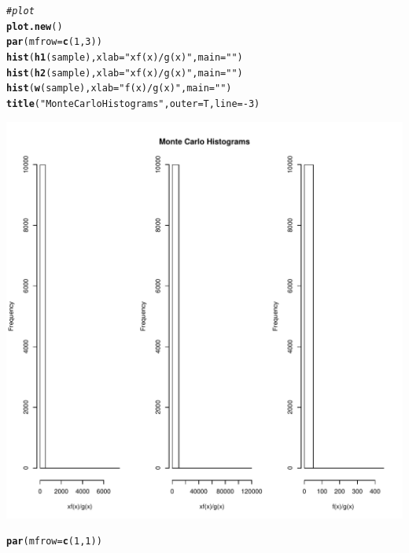 \documentclass[11pt]{article}\usepackage[]{graphicx}\usepackage[]{color}
\makeatletter
\def\maxwidth{ %
  \ifdim\Gin@nat@width>\linewidth
    \linewidth
  \else
    \Gin@nat@width
  \fi
}
\newcommand{\hlnum}[1]{\textcolor[rgb]{0.686,0.059,0.569}{#1}}%
\newcommand{\hlstr}[1]{\textcolor[rgb]{0.192,0.494,0.8}{#1}}%
\newcommand{\hlcom}[1]{\textcolor[rgb]{0.678,0.584,0.686}{\textit{#1}}}%
\newcommand{\hlopt}[1]{\textcolor[rgb]{0,0,0}{#1}}%
\newcommand{\hlstd}[1]{\textcolor[rgb]{0.345,0.345,0.345}{#1}}%
\newcommand{\hlkwc}[1]{\textcolor[rgb]{0.333,0.667,0.333}{#1}}%
\newcommand{\hlkwd}[1]{\textcolor[rgb]{0.737,0.353,0.396}{\textbf{#1}}}%
\newenvironment{kframe}{%
 \def\at@end@of@kframe{}%
 \ifinner\ifhmode%
  \def\at@end@of@kframe{\end{minipage}}%
  \begin{minipage}{\columnwidth}%
 \fi\fi%
 \def\FrameCommand##1{\hskip\@totalleftmargin \hskip-\fboxsep
 \colorbox{shadecolor}{##1}\hskip-\fboxsep
     \hskip-\linewidth \hskip-\@totalleftmargin \hskip\columnwidth}%
 \MakeFramed {\advance\hsize-\width
   \@totalleftmargin\z@ \linewidth\hsize
   \@setminipage}}%
 {\par\unskip\endMakeFramed%
 \at@end@of@kframe}
\newenvironment{knitrout}{}{} %
\makeatother
\begin{document}
\begin{knitrout}
\color{fgcolor}\begin{kframe}
\begin{alltt}
\hlcom{#plot}
\hlkwd{plot.new}\hlstd{()}
\hlkwd{par}\hlstd{(}\hlkwc{mfrow}\hlstd{=}\hlkwd{c}\hlstd{(}\hlnum{1}\hlstd{,}\hlnum{3}\hlstd{))}
\hlkwd{hist}\hlstd{(}\hlkwd{h1}\hlstd{(sample),}\hlkwc{xlab}\hlstd{=}\hlstr{"xf(x)/g(x)"}\hlstd{,}\hlkwc{main}\hlstd{=}\hlstr{""}\hlstd{)}
\hlkwd{hist}\hlstd{(}\hlkwd{h2}\hlstd{(sample),}\hlkwc{xlab}\hlstd{=}\hlstr{"xf(x)/g(x)"}\hlstd{,}\hlkwc{main}\hlstd{=}\hlstr{""}\hlstd{)}
\hlkwd{hist}\hlstd{(} \hlkwd{w}\hlstd{(sample),}\hlkwc{xlab}\hlstd{=}\hlstr{"f(x)/g(x) "}\hlstd{,}\hlkwc{main}\hlstd{=}\hlstr{""}\hlstd{)}
\hlkwd{title}\hlstd{(}\hlstr{"Monte Carlo Histograms"}\hlstd{,}\hlkwc{outer}\hlstd{=T,}\hlkwc{line}\hlstd{=}\hlopt{-}\hlnum{3}\hlstd{)}
\end{alltt}
\end{kframe}
\includegraphics[width=\maxwidth]{figure/unnamed-chunk-11-1} 
\begin{kframe}\begin{alltt}
\hlkwd{par}\hlstd{(}\hlkwc{mfrow}\hlstd{=}\hlkwd{c}\hlstd{(}\hlnum{1}\hlstd{,}\hlnum{1}\hlstd{))}
\end{alltt}
\end{kframe}
\end{knitrout}
\end{document}
